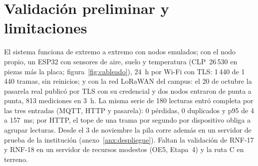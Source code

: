 \section{Validación preliminar y limitaciones}

El sistema funciona de extremo a extremo con nodos emulados; con el nodo propio, un ESP32 con sensores de aire, suelo y temperatura (CLP~26\,530 en piezas más la placa; figura~\ref{fig:cableado}), 24~h por Wi-Fi con TLS: 1\,440 de 1\,440 tramas, sin reinicios; y con la red LoRaWAN del campus: el 20 de octubre la pasarela real publicó por TLS con su credencial y dos nodos entraron de punta a punta, 813 mediciones en 3~h. La misma serie de 180 lecturas entró completa por las tres entradas (MQTT, HTTP y pasarela): 0 pérdidas, 0 duplicados y p95 de 4 a 157~ms; por HTTP, el tope de una trama por segundo por dispositivo obliga a agrupar lecturas. Desde el 3 de noviembre la pila corre además en un servidor de prueba de la institución (anexo~\ref{anx:despliegue}). Faltan la validación de RNF-17 y RNF-18 en un servidor de recursos modestos (OE5, Etapa~4) y la ruta C en terreno.
